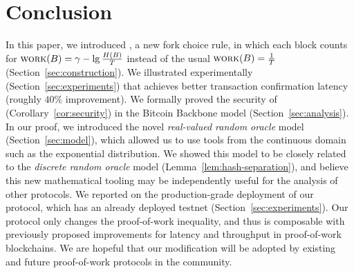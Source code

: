 \section{Conclusion}

In this paper, we introduced \poem, a new fork choice rule, in which each block
counts for $\textsc{work}(B) = \gamma - \lg \frac{H(B)}{T}$ instead of the usual $\textsc{work}(B) = \frac{1}{T}$
(Section~\ref{sec:construction}).
We illustrated experimentally (Section~\ref{sec:experiments}) that \poem achieves better transaction confirmation latency
(roughly $40\%$ improvement). We formally proved the security of \poem (Corollary~\ref{cor:security})
in the Bitcoin Backbone model
(Section~\ref{sec:analysis}).
In our proof, we introduced the novel \emph{real-valued random oracle} model (Section~\ref{sec:model}), which allowed us
to use tools from the continuous domain such as the exponential distribution. We showed this
model to be closely related to the \emph{discrete random oracle} model (Lemma~\ref{lem:hash-separation}),
and believe this new mathematical tooling may be independently useful for the analysis of other protocols.
We reported on the production-grade deployment of our protocol, which has an already deployed testnet
(Section~\ref{sec:experiments}).
Our protocol only changes the proof-of-work inequality, and thus is composable with
previously proposed improvements for latency and throughput in proof-of-work blockchains. We are hopeful
that our modification will be adopted by existing and future proof-of-work protocols in the community.